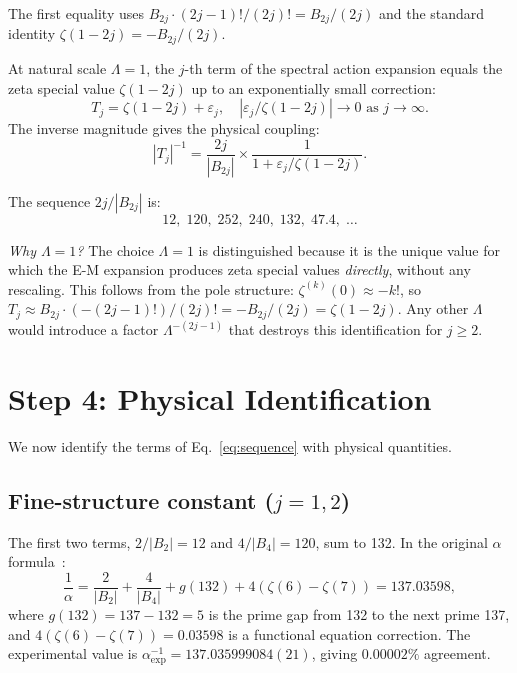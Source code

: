 \documentclass[aps,prl,twocolumn,superscriptaddress,nofootinbib]{revtex4-2}
\begin{document}
\noindent The first equality uses $B_{2j}\cdot(2j{-}1)!/(2j)!=B_{2j}/(2j)$ and the standard identity $\zeta(1{-}2j)=-B_{2j}/(2j)$.

\begin{theorem}\label{thm:main}
At natural scale $\Lambda=1$, the $j$-th term of the spectral action
expansion equals the zeta special value $\zeta(1{-}2j)$ up to an
exponentially small correction:
\begin{equation}
  T_j = \zeta(1{-}2j) + \varepsilon_j,
  \quad |\varepsilon_j/\zeta(1{-}2j)|\to 0 \text{ as } j\to\infty.
\end{equation}
The inverse magnitude gives the physical coupling:
\begin{equation}\label{eq:coupling}
  |T_j|^{-1} = \frac{2j}{|B_{2j}|}\times\frac{1}{1+\varepsilon_j/\zeta(1{-}2j)}.
\end{equation}
\end{theorem}

\noindent The sequence $2j/|B_{2j}|$ is:
\begin{equation}\label{eq:sequence}
  12,\;120,\;252,\;240,\;132,\;47.4,\;\ldots
\end{equation}

\noindent\emph{Why $\Lambda=1$?}  The choice $\Lambda=1$ is
distinguished because it is the unique value for which the E-M
expansion produces zeta special values \emph{directly}, without any
rescaling.  This follows from the pole structure: $\zeta^{(k)}(0)
\approx -k!$, so $T_j\approx B_{2j}\cdot(-(2j{-}1)!)/(2j)!
=-B_{2j}/(2j)=\zeta(1{-}2j)$.  Any other $\Lambda$ would introduce
a factor $\Lambda^{-(2j-1)}$ that destroys this identification for
$j\geq 2$.

\section{Step 4: Physical Identification}

We now identify the terms of Eq.~\eqref{eq:sequence} with physical
quantities.

\subsection{Fine-structure constant ($j=1,2$)}

The first two terms, $2/|B_2|=12$ and $4/|B_4|=120$, sum to 132.
In the original $\alpha$ formula~\cite{WB_alpha}:
\begin{equation}\label{eq:alpha}
  \frac{1}{\alpha}=\frac{2}{|B_2|}+\frac{4}{|B_4|}+g(132)+4(\zeta(6)-\zeta(7))
  =137.03598,
\end{equation}
where $g(132)=137-132=5$ is the prime gap from 132 to the next
prime 137, and $4(\zeta(6)-\zeta(7))=0.03598$ is a functional
equation correction.  The experimental value is
$\alpha^{-1}_{\mathrm{exp}}=137.035999084(21)$, giving
$0.00002\%$ agreement.
\end{document}
